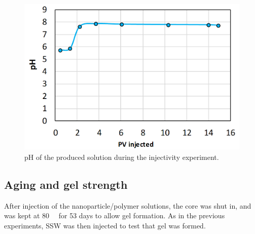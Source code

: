 \begin{figure}[h!]
    \centering
    \includegraphics[width=\textwidth]{img/cht/phProduced.png}
    \caption{pH of the produced solution during the injectivity experiment.}
    \label{cht:phProduced} %
\end{figure}

\subsection{Aging and gel strength}
After injection of the nanoparticle/polymer solutions, the core was shut in, and was kept at 80~\celsius~ for 53 days to allow gel formation. As in the previous experiments, SSW was then injected to test that gel was formed. 

